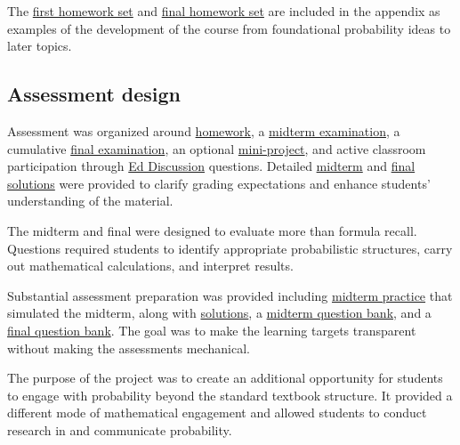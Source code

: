 \documentclass[11pt]{article}
\begin{document}
The \hyperref[appendix:math394-hw1]{first homework set}
and \hyperref[appendix:math394-hw8]{final homework set}
are included in the appendix as examples of the development of the
course from foundational probability ideas to later topics.
\subsection{Assessment design}

Assessment was organized around
\href{https://armanjg.github.io/MATH-394-Probability-1-v2/}{homework},
a
\href{https://armanjg.github.io/MATH-394-Probability-1-v2/Exams/midterm.pdf}
{midterm examination},
a cumulative
\href{https://armanjg.github.io/MATH-394-Probability-1-v2/Exams/final.pdf}
{final examination},
an optional
\href{https://armanjg.github.io/MATH-394-Probability-1-v2/project.pdf}
{mini-project},
and active classroom participation through
\href{https://edstem.org/}{Ed Discussion}
questions.
Detailed
\href{https://armanjg.github.io/MATH-394-Probability-1-v2/Exams/midterm_solution.pdf}
{midterm}
and
\href{https://armanjg.github.io/MATH-394-Probability-1-v2/Exams/final_solution.pdf}
{final solutions}
were provided to clarify grading expectations and enhance students'
understanding of the material.

The midterm and final were designed to evaluate more than
formula recall.
Questions required students to identify appropriate
probabilistic structures,
carry out mathematical calculations,
and interpret results.

Substantial assessment preparation was provided
including
\href{https://armanjg.github.io/MATH-394-Probability-1-v2/Exams/midterm_practice.pdf}
{midterm practice} that simulated the midterm, along with
\href{https://armanjg.github.io/MATH-394-Probability-1-v2/Exams/midterm_practice_solution.pdf}{solutions},
a
\href{https://armanjg.github.io/MATH-394-Probability-1-v2/Exams/midterm-question-bank.pdf}
{midterm question bank},
and a
\href{https://armanjg.github.io/MATH-394-Probability-1-v2/Exams/final-question-bank.pdf}
{final question bank}.
The goal was to make the learning targets transparent without
making the assessments mechanical.



The purpose of the project was to create an additional
opportunity for students to engage with probability beyond the
standard textbook structure.
It provided a different mode of mathematical engagement and
allowed students to conduct research in and communicate probability.
 
\end{document}
